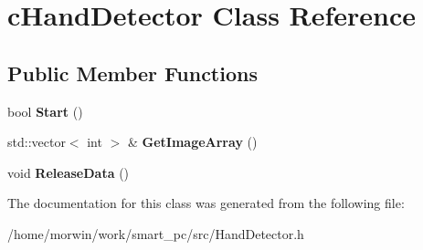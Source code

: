\hypertarget{classcHandDetector}{
\section{cHandDetector Class Reference}
\label{classcHandDetector}
}
\subsection*{Public Member Functions}
\begin{DoxyCompactItemize}
\item 
\hypertarget{classcHandDetector_a56bd5b66bff33fe375e6a4e97b394481}{
bool {\bfseries Start} ()}
\label{classcHandDetector_a56bd5b66bff33fe375e6a4e97b394481}

\item 
\hypertarget{classcHandDetector_a10bca4c52203b33a453f4a7017d03d65}{
std::vector$<$ int $>$ \& {\bfseries GetImageArray} ()}
\label{classcHandDetector_a10bca4c52203b33a453f4a7017d03d65}

\item 
\hypertarget{classcHandDetector_acadedbb4524af49f115cc133a47ba69d}{
void {\bfseries ReleaseData} ()}
\label{classcHandDetector_acadedbb4524af49f115cc133a47ba69d}

\end{DoxyCompactItemize}


The documentation for this class was generated from the following file:\begin{DoxyCompactItemize}
\item 
/home/morwin/work/smart\_\-pc/src/HandDetector.h\end{DoxyCompactItemize}
